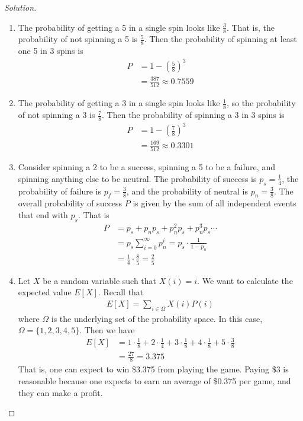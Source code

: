 \documentclass[12pt]{article}
\theoremstyle{definition}
\newenvironment{solution}{
  \begin{proof}[Solution]
    \vspace{-8px}
    \setlength{\parskip}{4px}
    \setlength{\parindent}{0px}
}{
\end{proof}
}
\begin{document}
  \begin{solution}
    \hfill
    \begin{enumerate}[label={\alph*.}]
      \item The probability of getting a 5 in a single spin looks like \(\frac{3}{8}\). That is, the probability of not spinning a 5 is \(\frac{5}{8}\). Then the probability of spinning at least one 5 in 3 spins is
      \begin{align*}
        P &= 1 - \left(\frac{5}{8}\right)^{3} \\
        &= \frac{387}{512} \approx 0.7559
      \end{align*}

      \item The probability of getting a 3 in a single spin looks like \(\frac{1}{8}\), so the probability of not spinning a 3 is \(\frac{7}{8}\). Then the probability of spinning a 3 in 3 spins is
      \begin{align*}
        P &= 1 - \left(\frac{7}{8}\right)^{3} \\
        &= \frac{169}{512} \approx 0.3301
      \end{align*}

      \item Consider spinning a 2 to be a success, spinning a 5 to be a failure, and spinning anything else to be neutral. The probability of success is \(p_{s} = \frac{1}{4}\), the probability of failure is \(p_{f} = \frac{3}{8}\), and the probability of neutral is \(p_{n} = \frac{3}{8}\). The overall probability of success \(P\) is given by the sum of all independent events that end with \(p_{s}\). That is
      \begin{align*}
        P &= p_{s} + p_{n}p_{s} + p_{n}^{2}p_{s} + p_{n}^{3}p_{s} \cdots \\
        &= p_{s} \sum_{i = 0}^{\infty} p_{n}^{i} = p_{s} \cdot \frac{1}{1 - p_{n}} \\
        &= \frac{1}{4} \cdot \frac{8}{5} = \frac{2}{5}
      \end{align*}

      \item Let \(X\) be a random variable such that \(X(i) = i\). We want to calculate the expected value \(E[X]\). Recall that
      \begin{align*}
        E[X] = \sum_{i \in \Omega} X(i)P(i)
      \end{align*}
      where \(\Omega\) is the underlying set of the probability space. In this case, \(\Omega = \{1, 2, 3, 4, 5\}\). Then we have
      \begin{align*}
        E[X] &= 1 \cdot \frac{1}{8} + 2 \cdot \frac{1}{4} + 3 \cdot \frac{1}{8} + 4 \cdot \frac{1}{8} + 5 \cdot \frac{3}{8} \\
        &= \frac{27}{8} = 3.375
      \end{align*}
      That is, one can expect to win \$3.375 from playing the game. Paying \$3 is reasonable because one expects to earn an average of \$0.375 per game, and they can make a profit.
    \end{enumerate}
  \end{solution}
\end{document}
